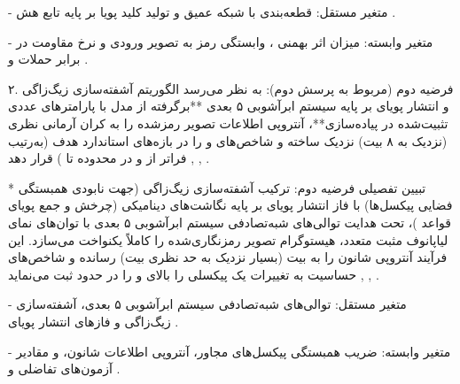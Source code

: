   {-} متغیر مستقل: قطعه‌بندی  با شبکه عمیق  و تولید کلید پویا بر پایه تابع هش .\par

  {-} متغیر وابسته: میزان اثر بهمنی ، وابستگی رمز به تصویر ورودی و نرخ مقاومت در برابر حملات  و .\par



۲. فرضیه دوم (مربوط به پرسش دوم): به نظر می‌رسد الگوریتم آشفته‌سازی زیگ‌زاگی و انتشار پویای  بر پایه سیستم ابرآشوبی ۵ بعدی **برگرفته از مدل  با پارامترهای عددی تثبیت‌شده در پیاده‌سازی**، آنتروپی اطلاعات تصویر رمز‌شده را به کران آرمانی نظری (نزدیک به ۸ بیت) نزدیک ساخته و شاخص‌های  و  را در بازه‌های استاندارد هدف (به‌رتیب فراتر از  و در محدوده  تا ) قرار دهد , , .\par

* تبیین تفصیلی فرضیه دوم: ترکیب آشفته‌سازی زیگ‌زاگی (جهت نابودی همبستگی فضایی پیکسل‌ها) با فاز انتشار پویای  بر پایه نگاشت‌های دینامیکی (چرخش و جمع پویای قواعد )، تحت هدایت توالی‌های شبه‌تصادفی سیستم ابرآشوبی ۵ بعدی با توان‌های نمای لیاپانوف مثبت متعدد، هیستوگرام تصویر رمزنگاری‌شده را کاملاً یکنواخت می‌سازد. این فرآیند آنتروپی شانون را به  بیت (بسیار نزدیک به حد نظری  بیت) رسانده و شاخص‌های حساسیت به تغییرات یک پیکسلی  را بالای  و  را در حدود  ثبت می‌نماید , , .\par

  {-} متغیر مستقل: توالی‌های شبه‌تصادفی سیستم ابرآشوبی ۵ بعدی، آشفته‌سازی زیگ‌زاگی و فازهای انتشار پویای .\par

  {-} متغیر وابسته: ضریب همبستگی پیکسل‌های مجاور، آنتروپی اطلاعات شانون، و مقادیر آزمون‌های تفاضلی  و .\par



